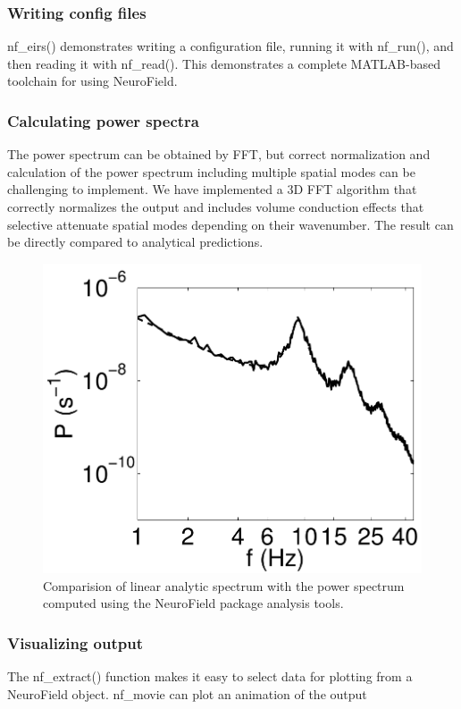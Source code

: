 \documentclass[preprint,review,10pt,authoryear,letterpaper]{elsarticle}
\begin{document}
\subsubsection{Writing config files}
nf\_eirs() demonstrates writing a configuration file, running it with nf\_run(), and then reading it with nf\_read(). This demonstrates a complete MATLAB-based toolchain for using NeuroField.

\subsubsection{Calculating power spectra}
The power spectrum can be obtained by FFT, but correct normalization and calculation of the power spectrum including multiple spatial modes can be challenging to implement. We have implemented a 3D FFT algorithm that correctly normalizes the output and includes volume conduction effects that selective attenuate spatial modes depending on their wavenumber. The result can be directly compared to analytical predictions.

\begin{figure}[!b]
\begin{center}
\includegraphics[width=0.80\columnwidth]{corticothalamic_comparison}
\caption{Comparision of linear analytic spectrum with the power spectrum computed using the NeuroField package analysis tools.}
\label{fig:ct_spectrum}
\end{center}
\end{figure}

\subsubsection{Visualizing output}
The nf\_extract() function makes it easy to select data for plotting from a NeuroField object.  
nf\_movie can plot an animation of the output
\end{document}
